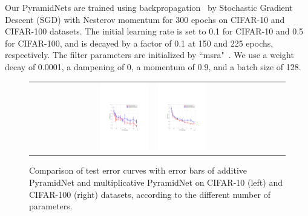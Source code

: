 \documentclass[10pt,twocolumn,letterpaper]{article}
\begin{document}
Our PyramidNets are trained using backpropagation~\cite{backprop} by Stochastic Gradient Descent (SGD) with Nesterov momentum for 300 epochs on CIFAR-10 and CIFAR-100 datasets. The initial learning rate is set to 0.1 for CIFAR-10 and 0.5 for CIFAR-100, and is decayed by a factor of 0.1 at 150 and 225 epochs, respectively. The filter parameters are initialized by ``msra"~\cite{prelu}. We use a weight decay of 0.0001, a dampening of 0, a momentum of 0.9, and a batch size of 128.
\begin{figure}[t]
\begin{center}
\begin{tabular}{cc}
\includegraphics[trim = 40mm 85mm 45mm 94mm, clip,  width=0.2\textwidth, height=0.175\textwidth]{Images2/addmulcomparison_cifar10_2.pdf} \ \quad
\includegraphics[trim = 40mm 85mm 45mm 94mm, clip,  width=0.2\textwidth, height=0.175\textwidth]{Images2/addmulcomparison_cifar100_2.pdf}
\end{tabular}
\end{center}
\caption{Comparison of test error curves with error bars of additive PyramidNet and multiplicative PyramidNet on CIFAR-10 (left) and CIFAR-100 (right) datasets, according to the different number of parameters.}
\label{fig:addmulcomparision}
\vspace{-3mm}
\end{figure}
\end{document}
